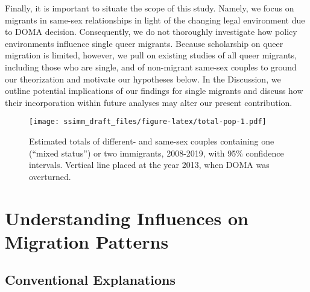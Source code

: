 \documentclass[
  12pt,
]{article}
\begin{document}
Finally, it is important to situate the scope of this study. Namely, we focus on migrants in same-sex relationships in light of the changing legal environment due to DOMA decision. Consequently, we do not thoroughly investigate how policy environments influence single queer migrants. Because scholarship on queer migration is limited, however, we pull on existing studies of all queer migrants, including those who are single, and of non-migrant same-sex couples to ground our theorization and motivate our hypotheses below. In the Discussion, we outline potential implications of our findings for single migrants and discuss how their incorporation within future analyses may alter our present contribution.

\begin{figure}
\centering
\texttt{[image: ssimm\_draft\_files/figure-latex/total-pop-1.pdf]}
\caption{\label{fig:total-pop}Estimated totals of different- and same-sex couples containing one (``mixed status'') or two immigrants, 2008-2019, with 95\% confidence intervals. Vertical line placed at the year 2013, when DOMA was overturned.}
\end{figure}

\hypertarget{understanding-influences-on-migration-patterns}{%
\section{Understanding Influences on Migration Patterns}\label{understanding-influences-on-migration-patterns}}

\hypertarget{conventional-explanations}{%
\subsection{Conventional Explanations}\label{conventional-explanations}}
\end{document}
